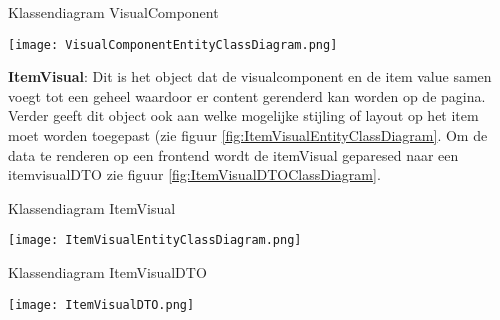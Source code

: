 \whitespace[2]
\begin{graphic}
    \captionsetup{type=figure}
    \caption{Klassendiagram VisualComponent}
    \texttt{[image: VisualComponentEntityClassDiagram.png]}
    \label{fig:VisualComponentEntityClassDiagram}
\end{graphic}

\whitespace[2]
\textbf{ItemVisual}: Dit is het object dat de visualcomponent en de item value samen voegt tot een geheel waardoor er content gerenderd kan worden op de pagina.
Verder geeft dit object ook aan welke mogelijke stijling of layout op het item moet worden toegepast (zie figuur \ref{fig:ItemVisualEntityClassDiagram}.
Om de data te renderen op een frontend wordt de itemVisual geparesed naar een itemvisualDTO zie figuur \ref{fig:ItemVisualDTOClassDiagram}.

\whitespace[2]
\begin{graphic}
	\captionsetup{type=figure}
	\caption{Klassendiagram ItemVisual}
	\texttt{[image: ItemVisualEntityClassDiagram.png]}
	\label{fig:ItemVisualEntityClassDiagram}
\end{graphic}

\whitespace[2]
\begin{graphic}
	\captionsetup{type=figure}
	\caption{Klassendiagram ItemVisualDTO}
	\texttt{[image: ItemVisualDTO.png]}
	\label{fig:ItemVisualDTOClassDiagram}
\end{graphic}
